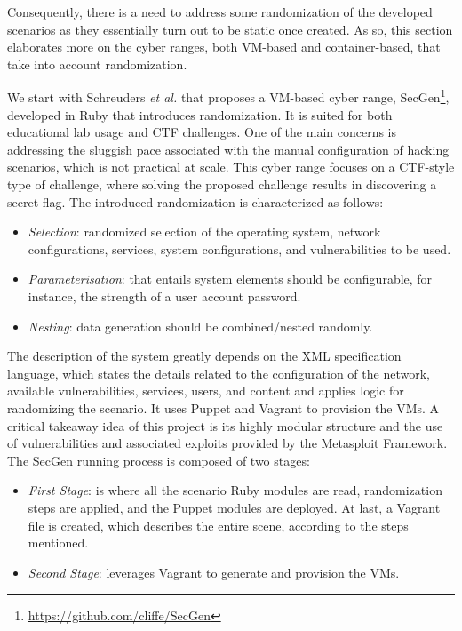 Consequently, there is a need to address some randomization of the developed scenarios as they essentially turn out to be static once created. As so, this section elaborates more on the cyber ranges, both VM-based and container-based, that take into account randomization.


We start with Schreuders \textit{et al.} \cite{secgen_ref} that proposes a VM-based cyber range, SecGen\footnote{\url{https://github.com/cliffe/SecGen}}, developed in Ruby that introduces randomization. It is suited for both educational lab usage and CTF challenges. One of the main concerns is addressing the sluggish pace associated with the manual configuration of hacking scenarios, which is not practical at scale. This cyber range focuses on a CTF-style type of challenge, where solving the proposed challenge results in discovering a secret flag. The introduced randomization is characterized as follows:

\begin{itemize}
    \item \textit{Selection}: randomized selection of the operating system, network configurations, services, system configurations, and vulnerabilities to be used.
    \item \textit{Parameterisation}: that entails system elements should be configurable, for instance, the strength of a user account password.
    \item \textit{Nesting}: data generation should be combined/nested randomly.
\end{itemize}

The description of the system greatly depends on the XML specification language, which states the details related to the configuration of the network, available vulnerabilities, services, users, and content and applies logic for randomizing the scenario. It uses Puppet and Vagrant to provision the VMs. A critical takeaway idea of this project is its highly modular structure and the use of vulnerabilities and associated exploits provided by the Metasploit Framework. The SecGen running process is composed of two stages:

\begin{itemize}
    \item \textit{First Stage}: is where all the scenario Ruby modules are read, randomization steps are applied, and the Puppet modules are deployed. At last, a Vagrant file is created, which describes the entire scene, according to the steps mentioned.
    \item \textit{Second Stage}: leverages Vagrant to generate and provision the VMs. 
\end{itemize}


